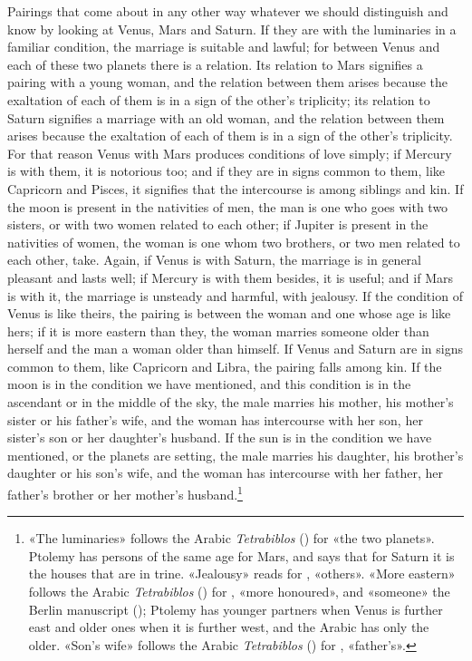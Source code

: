 \documentclass[11pt]{article}
\newcommand{\Fol}[1]{\marginpar{\footnotesize\color{gray}f.\,#1}}
\begin{document}
\par \Fol{69r}Pairings that come about in any other way whatever we should distinguish and know by looking at Venus, Mars and Saturn. If they are with the luminaries in a familiar condition, the marriage is suitable and lawful; for between Venus and each of these two planets there is a relation. Its relation to Mars signifies a pairing with a young woman, and the relation between them arises because the exaltation of each of them is in a sign of the other's triplicity; its relation to Saturn signifies a marriage with an old woman, and the relation between them arises because the exaltation of each of them is in a sign of the other's triplicity. For that reason Venus with Mars produces conditions of love simply; if Mercury is with them, it is notorious too; and if they are in signs common to them, like Capricorn and Pisces, it signifies that the intercourse is among siblings and kin. If the moon is present in the nativities of men, the man is one who goes with two sisters, or with two women related to each other; if Jupiter is present in the nativities of women, the woman is one whom two brothers, or two men related to each other, take. Again, if Venus is with Saturn, the marriage is in general pleasant and lasts well; if Mercury is with them besides, it is useful; and if Mars is with it, the marriage is unsteady and harmful, with jealousy. If the condition of Venus is like theirs, the pairing is between the woman and one whose age is like hers; if it is more eastern than they, the woman marries someone older than herself and the man a woman older than himself. If Venus and Saturn are in signs common to them, like Capricorn and Libra, the pairing falls among kin. If the moon is in the condition we have mentioned, and this condition is in the ascendant or in the middle of the sky, the male marries his mother, his mother's sister or his father's wife, and the woman has intercourse with her son, her sister's son or her daughter's husband. If the sun is in the condition we have mentioned, or the planets are setting, the male marries his daughter, his brother's daughter or his son's wife, and the woman has intercourse with her father, her father's brother or her mother's husband.\footnote{«The luminaries» follows the Arabic \emph{Tetrabiblos} () for «the two planets». Ptolemy has persons of the same age for Mars, and says that for Saturn it is the houses that are in trine. «Jealousy» reads  for , «others». «More eastern» follows the Arabic \emph{Tetrabiblos} () for , «more honoured», and «someone» the Berlin manuscript (); Ptolemy has younger partners when Venus is further east and older ones when it is further west, and the Arabic has only the older. «Son's wife» follows the Arabic \emph{Tetrabiblos} () for , «father's».}\par
\end{document}
